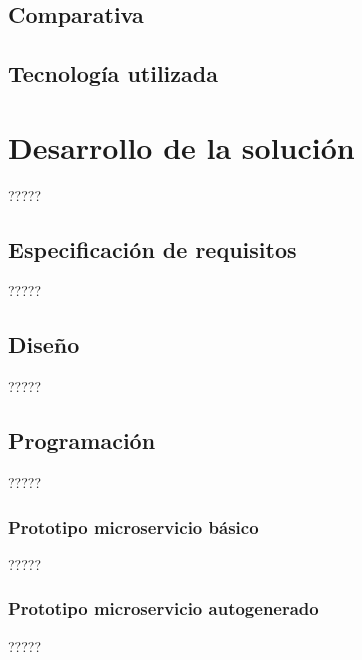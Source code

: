\documentclass[11pt,spanish,listoffigures]{tfgetsinf}
\begin{document}
\section{Comparativa}

\section{Tecnología utilizada}


\chapter{Desarrollo de la solución}

?????


\section{Especificación de requisitos}

?????


\section{Diseño}

?????


\section{Programación}

?????

\subsection{Prototipo microservicio básico}

?????

\subsection{Prototipo microservicio autogenerado}

?????
\end{document}

